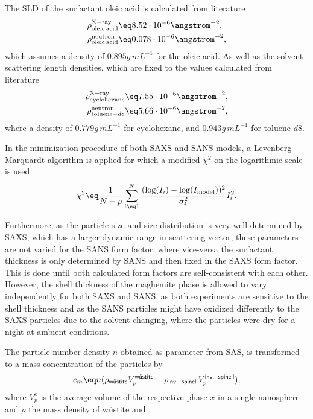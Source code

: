 \documentclass[\main/dresen_thesis.tex]{subfiles}
\begin{document}
    The SLD of the surfactant oleic acid is calculated from literature
    \begin{align}
      \rho^\mathrm{X-ray}_\mathrm{oleic\,acid} &\eq 8.52 \cdot 10^{-6} \angstrom^{-2},\\
      \rho^\mathrm{neutron}_\mathrm{oleic\,acid} &\eq 0.078 \cdot 10^{-6} \angstrom^{-2},
    \end{align}
    which assumes a density of $0.895 \unit{g\,mL^{-1}}$ for the oleic acid.
    As well as the solvent scattering length densities, which are fixed to the values calculated from literature
    \begin{align}
      \rho^\mathrm{X-ray}_{\mathrm{cyclohexane}} &\eq 7.55 \cdot 10^{-6} \angstrom^{-2},\\
      \rho^\mathrm{neutron}_{\mathrm{toluene-}d8}  &\eq 5.66 \cdot 10^{-6} \angstrom^{-2},
    \end{align}
    where a density of $0.779 \unit{g\,mL^{-1}}$ for cyclohexane, and $0.943 \unit{g\,mL^{-1}}$ for toluene-$\mathit{d8}$.

    In the minimization procedure of both SAXS and SANS models, a Levenberg-Marquardt algorithm\cite{Marquardt_1963_Analgo, Oliphant_2006_Guide} is applied for which a modified $\chi^2$ on the logarithmic scale is used
    \begin{align}
      \chi^2 \eq \frac{1}{N-p} \sum_{i\eq 1}^{N} \frac{(\log(I_i) - \log(I_\mathrm{model}))^2}{\sigma_i^2} I^2_i.
    \end{align}

    Furthermore, as the particle size and size distribution is very well determined by SAXS, which has a larger dynamic range in scattering vector, these parameters are not varied for the SANS form factor, where vice-versa the surfactant thickness is only determined by SANS and then fixed in the SAXS form factor.
    This is done until both calculated form factors are self-consistent with each other.
    However, the shell thickness of the maghemite phase is allowed to vary independently for both SAXS and SANS, as both experiments are sensitive to the shell thickness and as the SANS particles might have oxidized differently to the SAXS particles due to the solvent changing, where the particles were dry for a night at ambient conditions.

    The particle number density $n$ obtained as parameter from SAS, is transformed to a mass concentration of the particles by
    \begin{align}
      c_m \eq n (\rho_\textsf{w\"ustite} V_p^\textsf{w\"ustite} + \rho_\textsf{inv.\, spinell} V_p^\textsf{inv.\, spinell}),
    \end{align}
    where $V^x_p$ is the average volume of the respective phase $x$ in a single nanosphere and $\rho$ the mass density of w\"ustite and .
\end{document}
